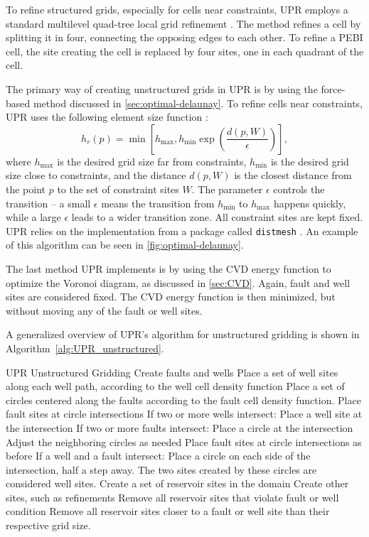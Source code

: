 To refine structured grids, especially for cells near constraints, UPR employs a standard multilevel quad-tree local grid refinement \cite[pp.49]{UPR_thesis}. The method refines a cell by splitting it in four, connecting the opposing edges to each other. To refine a PEBI cell, the site creating the cell is replaced by four sites, one in each quadrant of the cell.

The primary way of creating unstructured grids in UPR is by using the force-based method discussed in \autoref{sec:optimal-delaunay}. To refine cells near constraints, UPR uses the following element size function \cite[Equation 4.2]{UPR_thesis}:
\begin{equation}
    h_r(p) = \min \left[
        h_{\max}, h_{\min} \exp \left(
            \frac{d(p, W)}{\epsilon}
        \right) \right],
\end{equation}
where $h_{\max}$ is the desired grid size far from constraints, $h_{\min}$ is the desired grid size close to constraints, and the distance $d(p, W)$ is the closest distance from the point $p$ to the set of constraint sites $W$. The parameter $\epsilon$ controls the transition -- a small $\epsilon$ means the transition from $h_{\min}$ to $h_{\max}$ happens quickly, while a large $\epsilon$ leads to a wider transition zone. All constraint sites are kept fixed. UPR relies on the implementation from a package called \verb|distmesh| \cite{Distmesh}. An example of this algorithm can be seen in \autoref{fig:optimal-delaunay}.

The last method UPR implements is by using the CVD energy function to optimize the Voronoi diagram, as discussed in \autoref{sec:CVD}. Again, fault and well sites are considered fixed. The CVD energy function is then minimized, but without moving any of the fault or well sites.

A generalized overview of UPR's algorithm for unstructured gridding \cite[pp.51]{UPR_thesis} is shown in Algorithm~\ref{alg:UPR_unstructured}.
\begin{pseudocode}[float=ht,label=alg:UPR_unstructured]{UPR Unstructured Gridding}
Create faults and wells
    Place a set of well sites along each well path, according to the well cell density function
    Place a set of circles centered along the faults according to the fault cell density function. Place fault sites at circle intersections
    If two or more wells intersect:
        Place a well site at the intersection
    If two or more faults intersect:
        Place a circle at the intersection
        Adjust the neighboring circles as needed
        Place fault sites at circle intersections as before
    If a well and a fault intersect:
        Place a circle on each side of the intersection, half a step away. The two sites created by these circles are considered well sites.
Create a set of reservoir sites in the domain
Create other sites, such as refinements
Remove all reservoir sites that violate fault or well condition
Remove all reservoir sites closer to a fault or well site than their respective grid size.
\end{pseudocode}

